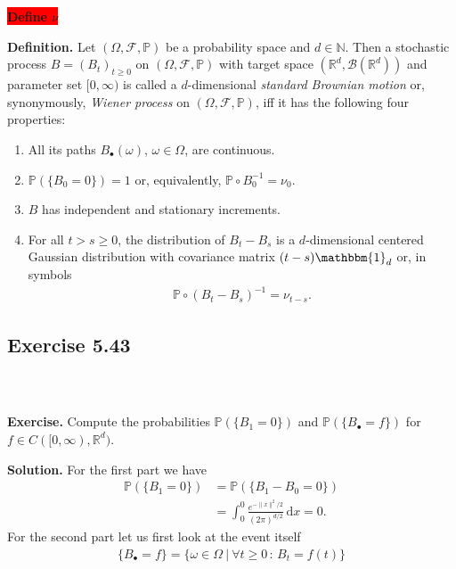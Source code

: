 \documentclass{beamer}
\numberwithin{equation}{section}
\newcommand{\task}[1]{
    \begin{center}
        \colorbox{red}{
            \textsf{
                \textbf{#1}
            }
        }
    \end{center}
}
\newenvironment{frame2}{\begin{frame}\frametitle{{\normalsize \secname} \\ {\large \subsecname}}}{\end{frame}}
\begin{document}
\begin{frame2}
    \task{Define $\nu$} 
    \textbf{Definition.} Let $(\Omega,\mathcal{F},\mathbb{P})$ be a probability space and $d\in\mathbb{N}$.
    Then a stochastic process $B = (B_t)_{t\geq 0}$ on $(\Omega,\mathcal{F},\mathbb{P})$ with target space $(\mathbb{R}^d,\mathcal{B}(\mathbb{R}^d))$ and parameter set $[0,\infty)$ is called a $d$-dimensional \textit{standard Brownian motion} or, synonymously, \textit{Wiener process} on $(\Omega,\mathcal{F},\mathbb{P})$, iff it has the following four properties:
    \begin{enumerate}
        \item All its paths $B_\bullet(\omega)$, $\omega \in \Omega$, are continuous.
        \item $\mathbb{P}(\{B_0 = 0\})=1$ or, equivalently, $\mathbb{P} \circ B^{-1}_0 = \nu_0$.
        \item $B$ has independent and stationary increments.
        \item For all $t > s \geq 0$, the distribution of $B_t - B_s$ is a $d$-dimensional centered Gaussian distribution with covariance matrix $(t-s)\mathbbm{1}_d$ or, in symbols
        \begin{align}
            \mathbb{P} \circ (B_t - B_s)^{-1} = \nu_{t - s}.
        \end{align} 
    \end{enumerate}
\end{frame2}

\subsection{Exercise 5.43}

\begin{frame2}
    \textbf{Exercise.} Compute the probabilities $\mathbb{P}(\{B_1 = 0\})$ and $\mathbb{P}(\{B_\bullet = f\})$ for $f \in C([0,\infty),\mathbb{R}^d)$.

    \vspace{10pt}
    \textbf{Solution.} 
    For the first part we have
    \begin{align}
        \mathbb{P}(\{B_1 = 0\}) &= \mathbb{P}(\{B_1 - B_0 = 0\}) \\
        &= \int_0^0 \frac{e^{-\|x\|^2/2}}{(2\pi)^{d/2}}\,\text{d}x = 0.
    \end{align}
    For the second part let us first look at the event itself
    \begin{align}
        \{B_\bullet = f\} = \{\omega \in \Omega \ | \ \forall t\geq 0\,:\, B_t = f(t)\}
    \end{align}
\end{frame2}
\end{document}

